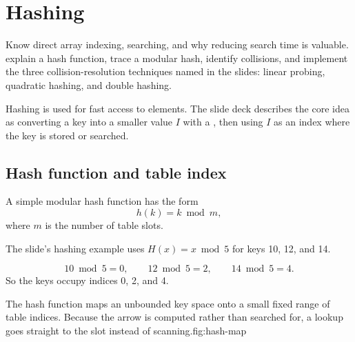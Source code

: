 \chapter{Hashing}\label{ch:hashing}

\chapterguide%
  {Know direct array indexing, searching, and why reducing search time is valuable.}
  {explain a hash function, trace a modular hash, identify collisions, and implement the three collision-resolution techniques named in the slides: linear probing, quadratic hashing, and double hashing.}

Hashing is used for fast access to elements. The slide deck describes the core idea as converting a key into a smaller value $I$ with a , then using $I$ as an index where the key is stored or searched.

\section{Hash function and table index}

A simple modular hash function has the form
\[
h(k)=k\bmod m,
\]
where $m$ is the number of table slots.

The slide's hashing example uses $H(x)=x\bmod5$ for keys 10, 12, and 14.

\begin{workedexample}
\[
10\bmod5=0,\qquad 12\bmod5=2,\qquad 14\bmod5=4.
\]
So the keys occupy indices 0, 2, and 4.
\end{workedexample}

\begin{utpfig}{The hash function maps an unbounded key space onto a small fixed range of
table indices. Because the arrow is computed rather than searched for, a lookup goes straight
to the slot instead of scanning.}{fig:hash-map}
\end{utpfig}

